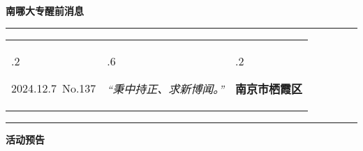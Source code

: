 \documentclass[letterpaper, 12pt]{article}
\begin{document}
\begin{center}
    \Huge\textbf{南哪大专醒前消息}
\end{center}
\vspace{4mm}
\hrule
\renewcommand\tabularxcolumn[1]{m{#1}}
\begin{tabularx}{\textwidth}{>{\hsize.2\hsize}X>{\hsize.6\hsize}X>{\hsize.2\hsize}X}
    \begin{flushleft}
        2024.12.7\, No.137
    \end{flushleft}
    &
    \begin{center}
        \textit{“秉中持正、求新博闻。”}
    \end{center}
    &
    \begin{flushright}
        \textbf{南京市栖霞区}
    \end{flushright}
\end{tabularx}
\vspace{-3.5mm}
\hrule
\vspace{4mm}
\centerline{\huge\textbf{活动预告}}
\end{document}
